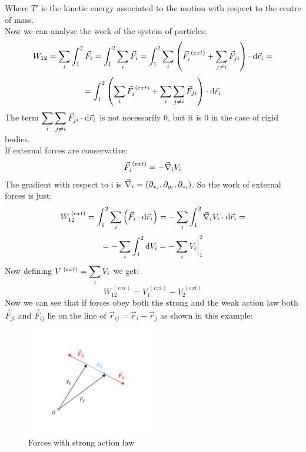 Where $T'$ is the kinetic energy associated to the motion with respect to the centre of mass.\\
Now we can analyse the work of the system of particles:
\begin{equation}
    W_{12} = \displaystyle\sum_i\int_{1}^{2}\vec{F}_i = \int_{1}^{2}\displaystyle\sum_i\vec{F}_i = \int_{1}^{2}\displaystyle\sum_i\left(\vec{F}_i^{\;(ext)} + \displaystyle\sum_{j\neq i}\vec{F}_{ji}\right)\cdot \dd{\vec{r}_i} =
\end{equation}
\begin{equation}
    = \int_{1}^{2}\left(\displaystyle\sum_i\vec{F}_i^{\;(ext)} + \displaystyle\sum_i\displaystyle\sum_{j\neq i}\vec{F}_{ji}\right)\cdot \dd{\vec{r}_i}
\end{equation}
The term $\displaystyle\sum_i\displaystyle\sum_{j\neq i}\vec{F}_{ji}\cdot \dd{\vec{r}_i}$ is not necessarily 0, but it is 0 in the case of rigid bodies.\\
If external forces are conservative:
\begin{equation}
    \vec{F}_i^{\;(ext)} = -\vec{\nabla}_i V_i
\end{equation}
The gradient with respect to i is $\vec{\nabla}_i = \left(\partial_{x_i}, \partial_{y_i}, \partial_{z_i}\right)$. So the work of external forces is just:
\begin{equation}
    W_{12}^{\;(ext)} = \int_{1}^{2}\displaystyle\sum_i\left(\vec{F}_i\cdot\dd{\vec{r}_i}\right) = -\displaystyle\sum_i\int_{1}^{2}\vec{\nabla}_i V_i\cdot\dd{\vec{r}_i} =
\end{equation}
\begin{equation}
    = -\displaystyle\sum_i\int_{1}^{2}\dd{V_i} = -\displaystyle\sum_i V_i\bigg|_1^2
\end{equation}
Now defining $V^{\;(ext)} = \displaystyle\sum_i V_i$ we get:
\begin{equation}
    W_{12}^{\;(ext)} = V^{\;(ext)}_1 - V^{\;(ext)}_2
\end{equation}
Now we can see that if forces obey both the strong and the weak action law both $\vec{F}_{ji}$ and $\vec{F}_{ij}$ lie on the line of $\vec{r}_{ij} = \vec{r}_i-\vec{r}_j$ as shown in this example:
\begin{figure}[H]
    \centering
    \includegraphics[width=0.5\textwidth]{res/svg/forcesstronglaw.drawio}
    \caption{Forces with strong action law}
    \label{fig:image5}
\end{figure}
